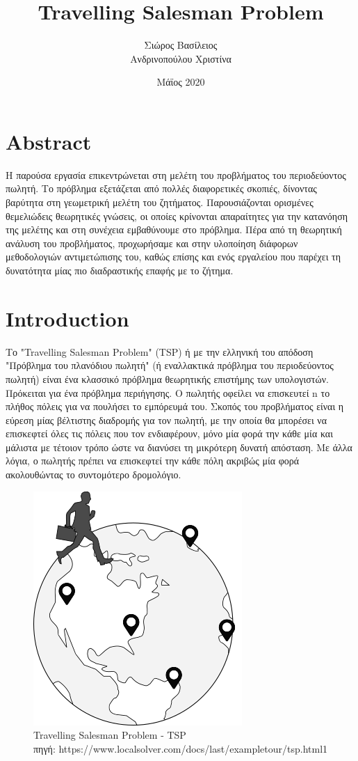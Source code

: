 \documentclass[oneside,12pt]{book}
\title{\huge Travelling Salesman Problem}
\author{Σιώρος Βασίλειος\\Ανδρινοπούλου Χριστίνα}
\date{Μάϊος 2020}
\newenvironment{matlab}
	{\begin{figure}[hp]\centering\captionsetup{justification=centering}}
	{\end{figure}}
\theoremstyle{definition}
\begin{document}
\maketitle
{}
\pagebreak
\tableofcontents

\chapter{Abstract}

Η παρούσα εργασία επικεντρώνεται στη μελέτη του προβλήματος του περιοδεύοντος πωλητή. Το πρόβλημα εξετάζεται από πολλές διαφορετικές σκοπιές, δίνοντας βαρύτητα στη γεωμετρική μελέτη του ζητήματος. Παρουσιάζονται ορισμένες θεμελιώδεις θεωρητικές γνώσεις, οι οποίες κρίνονται απαραίτητες για την κατανόηση της μελέτης και στη συνέχεια εμβαθύνουμε στο πρόβλημα. Πέρα από τη θεωρητική ανάλυση του προβλήματος, προχωρήσαμε και στην υλοποίηση διάφορων μεθοδολογιών αντιμετώπισης του, καθώς επίσης και ενός εργαλείου που παρέχει τη δυνατότητα μίας πιο διαδραστικής επαφής με το ζήτημα.

\chapter{Introduction}

Το "Travelling Salesman Problem" (TSP) ή με την ελληνική του απόδοση "Πρόβλημα του πλανόδιου πωλητή" (ή εναλλακτικά πρόβλημα του περιοδεύοντος πωλητή) είναι ένα κλασσικό πρόβλημα θεωρητικής επιστήμης των  υπολογιστών. Πρόκειται για ένα πρόβλημα περιήγησης. Ο πωλητής οφείλει να επισκευτεί n το πλήθος πόλεις για να πουλήσει το εμπόρευμά του. Σκοπός του προβλήματος είναι η εύρεση μίας βέλτιστης διαδρομής για τον πωλητή, με την οποία θα μπορέσει να επισκεφτεί όλες τις πόλεις που τον ενδιαφέρουν, μόνο μία φορά την κάθε μία και μάλιστα με τέτοιον τρόπο ώστε να διανύσει τη μικρότερη δυνατή απόσταση. Με άλλα λόγια, ο πωλητής πρέπει να επισκεφτεί την κάθε πόλη ακριβώς μία φορά ακολουθώντας το συντομότερο δρομολόγιο. \\

\begin{matlab}
	\includegraphics[scale=0.8]{images/tsp.png}
	\caption{Travelling Salesman Problem - TSP \\ πηγή: https://www.localsolver.com/docs/last/exampletour/tsp.html1}
\end{matlab}
\end{document}

